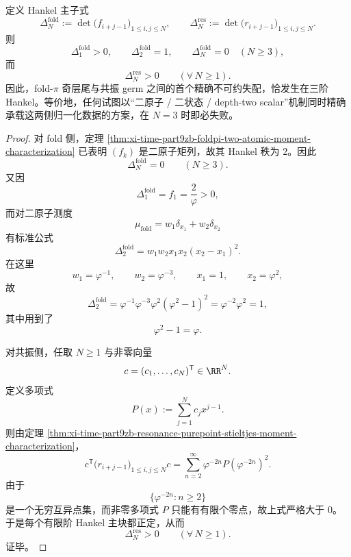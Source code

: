 \begin{theorem}\label{thm:xi-time-part9zb-third-order-hankel-obstruction}
定义 Hankel 主子式
\[
\Delta_N^{\mathrm{fold}}
:=
\det\bigl(f_{i+j-1}\bigr)_{1\le i,j\le N},
\qquad
\Delta_N^{\mathrm{res}}
:=
\det\bigl(r_{i+j-1}\bigr)_{1\le i,j\le N}.
\]
则
\[
\Delta_1^{\mathrm{fold}}>0,
\qquad
\Delta_2^{\mathrm{fold}}=1,
\qquad
\Delta_N^{\mathrm{fold}}=0
\quad (N\ge 3),
\]
而
\[
\Delta_N^{\mathrm{res}}>0
\qquad (\forall\,N\ge 1).
\]
因此，fold-\(\pi\) 奇层尾与共振 germ 之间的首个精确不可约失配，恰发生在三阶 Hankel。等价地，任何试图以“二原子 / 二状态 / depth-two scalar”机制同时精确承载这两侧归一化数据的方案，在 \(N=3\) 时即必失败。
\end{theorem}
\begin{proof}
对 fold 侧，定理 \ref{thm:xi-time-part9zb-foldpi-two-atomic-moment-characterization} 已表明 \((f_k)\) 是二原子矩列，故其 Hankel 秩为 \(2\)。因此
\[
\Delta_N^{\mathrm{fold}}=0
\qquad (N\ge 3).
\]
又因
\[
\Delta_1^{\mathrm{fold}}=f_1=\frac{2}{\varphi}>0,
\]
而对二原子测度
\[
\mu_{\mathrm{fold}}=w_1\delta_{x_1}+w_2\delta_{x_2}
\]
有标准公式
\[
\Delta_2^{\mathrm{fold}}=w_1w_2x_1x_2(x_2-x_1)^2.
\]
在这里
\[
w_1=\varphi^{-1},\qquad
w_2=\varphi^{-3},\qquad
x_1=1,\qquad
x_2=\varphi^2,
\]
故
\[
\Delta_2^{\mathrm{fold}}
=
\varphi^{-1}\varphi^{-3}\varphi^2(\varphi^2-1)^2
=
\varphi^{-2}\varphi^2
=1,
\]
其中用到了
\[
\varphi^2-1=\varphi.
\]

对共振侧，任取 \(N\ge 1\) 与非零向量
\[
c=(c_1,\dots,c_N)^{\mathsf T}\in\RR^N.
\]
定义多项式
\[
P(x):=\sum_{j=1}^{N}c_j x^{j-1}.
\]
则由定理 \ref{thm:xi-time-part9zb-resonance-purepoint-stieltjes-moment-characterization}，
\[
c^{\mathsf T}\bigl(r_{i+j-1}\bigr)_{1\le i,j\le N}c
=
\sum_{n=2}^{\infty}\varphi^{-2n}P(\varphi^{-2n})^2.
\]
由于
\[
\{\varphi^{-2n}:n\ge 2\}
\]
是一个无穷互异点集，而非零多项式 \(P\) 只能有有限个零点，故上式严格大于 \(0\)。于是每个有限阶 Hankel 主块都正定，从而
\[
\Delta_N^{\mathrm{res}}>0
\qquad (\forall\,N\ge 1).
\]
证毕。
\end{proof}

